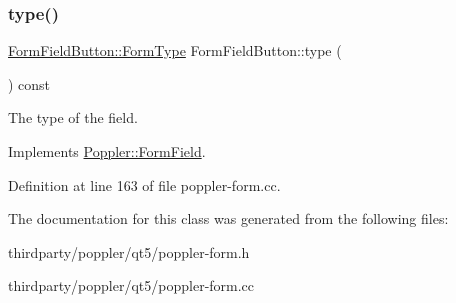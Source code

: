 \subsubsection{\texorpdfstring{type()}{type()}}
{\footnotesize\ttfamily \hyperlink{class_poppler_1_1_form_field_af9b28bf05b29780f81445b21a0ed7423}{Form\+Field\+Button\+::\+Form\+Type} Form\+Field\+Button\+::type (\begin{DoxyParamCaption}{ }\end{DoxyParamCaption}) const\hspace{0.3cm}{\ttfamily [virtual]}}

The type of the field. 

Implements \hyperlink{class_poppler_1_1_form_field_aec536e2f0468aedcc6b6d7df034442b2}{Poppler\+::\+Form\+Field}.



Definition at line 163 of file poppler-\/form.\+cc.



The documentation for this class was generated from the following files\+:\begin{DoxyCompactItemize}
\item 
thirdparty/poppler/qt5/poppler-\/form.\+h\item 
thirdparty/poppler/qt5/poppler-\/form.\+cc\end{DoxyCompactItemize}
